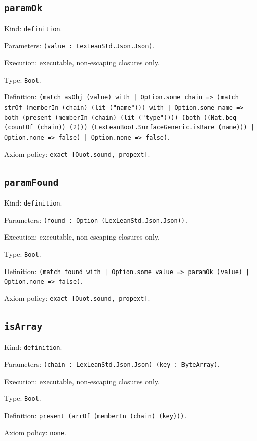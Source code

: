 \documentclass[11pt]{article}
\begin{document}
\subsection*{\texttt{paramOk}}
\noindent Kind: \texttt{definition}.\par
\noindent Parameters: \texttt{(value : LexLeanStd.Json.Json)}.\par
\noindent Execution: executable, non-escaping closures only.\par
\noindent Type: \texttt{Bool}.\par
\noindent Definition: \texttt{(match asObj (value) with | Option.some chain => (match strOf (memberIn (chain) (lit ("name"))) with | Option.some name => both (present (memberIn (chain) (lit ("type")))) (both ((Nat.beq (countOf (chain)) (2))) (LexLeanBoot.SurfaceGeneric.isBare (name))) | Option.none => false) | Option.none => false)}.\par
\noindent Axiom policy: \texttt{exact [Quot.sound, propext]}.\par
\subsection*{\texttt{paramFound}}
\noindent Kind: \texttt{definition}.\par
\noindent Parameters: \texttt{(found : Option (LexLeanStd.Json.Json))}.\par
\noindent Execution: executable, non-escaping closures only.\par
\noindent Type: \texttt{Bool}.\par
\noindent Definition: \texttt{(match found with | Option.some value => paramOk (value) | Option.none => false)}.\par
\noindent Axiom policy: \texttt{exact [Quot.sound, propext]}.\par
\subsection*{\texttt{isArray}}
\noindent Kind: \texttt{definition}.\par
\noindent Parameters: \texttt{(chain : LexLeanStd.Json.Json) (key : ByteArray)}.\par
\noindent Execution: executable, non-escaping closures only.\par
\noindent Type: \texttt{Bool}.\par
\noindent Definition: \texttt{present (arrOf (memberIn (chain) (key)))}.\par
\noindent Axiom policy: \texttt{none}.\par
\end{document}
